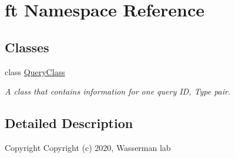 \hypertarget{namespaceft}{}\section{ft Namespace Reference}
\label{namespaceft}
\subsection*{Classes}
\begin{DoxyCompactItemize}
\item 
class \hyperlink{classft_1_1QueryClass}{Query\+Class}
\begin{DoxyCompactList}\small\item\em A class that contains information for one query ID, Type pair. \end{DoxyCompactList}\end{DoxyCompactItemize}


\subsection{Detailed Description}
\begin{DoxyCopyright}{Copyright}
Copyright (c) 2020, Wasserman lab 
\end{DoxyCopyright}

